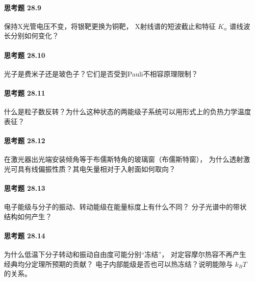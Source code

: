 \paragraph{思考题 28.9}
保持X光管电压不变，将银靶更换为铜靶，
X射线谱的短波截止和特征 \(K_\alpha\) 谱线波长分别如何变化？
\paragraph{思考题 28.10}
光子是费米子还是玻色子？它们是否受到Pauli不相容原理限制？
\paragraph{思考题 28.11}
什么是粒子数反转？为什么这种状态的两能级子系统可以用形式上的负热力学温度表征？
\paragraph{思考题 28.12}
在激光器出光端安装倾角等于布儒斯特角的玻璃窗（布儒斯特窗），
为什么透射激光可具有线偏振性质？其电矢量相对于入射面如何取向？
\paragraph{思考题 28.13}
电子能级与分子的振动、转动能级在能量标度上有什么不同？
分子光谱中的带状结构如何产生？
\paragraph{思考题 28.14}
为什么低温下分子转动和振动自由度可能分别“冻结”，
对定容摩尔热容不再产生经典均分定理所预期的贡献？
电子内部能级是否也可以热冻结？说明能隙与 \(k_BT\) 的关系。

